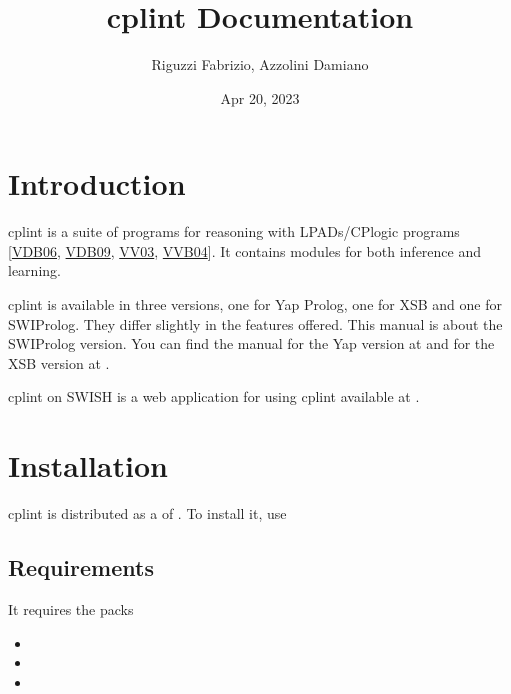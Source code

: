 \documentclass[letterpaper,10pt,english]{sphinxmanual}
\title{cplint Documentation}
\date{Apr 20, 2023}
\author{Riguzzi Fabrizio, Azzolini Damiano}
\begin{document}
\pagestyle{empty}
\sphinxmaketitle
\pagestyle{plain}
\sphinxtableofcontents
\pagestyle{normal}
\label{\detokenize{index::doc}}



\chapter{Introduction}
\label{\detokenize{index:introduction}}
\sphinxAtStartPar
cplint is a suite of programs for reasoning with LPADs/CP\sphinxhyphen{}logic programs {[}\hyperlink{cite.index:id66}{VDB06}, \hyperlink{cite.index:id67}{VDB09}, \hyperlink{cite.index:id65}{VV03}, \hyperlink{cite.index:id45}{VVB04}{]}.
It contains modules for both inference and learning.

\sphinxAtStartPar
cplint is available in three versions, one for Yap Prolog, one for XSB and one for SWI\sphinxhyphen{}Prolog.
They differ slightly in the features offered.
This manual is about the SWI\sphinxhyphen{}Prolog version.
You can find the manual for the Yap version at  and
for the XSB version at .

\sphinxAtStartPar
cplint on SWISH is a web application for using cplint available at .


\chapter{Installation}
\label{\detokenize{index:installation}}
\sphinxAtStartPar
cplint is distributed as a  of .
To install it, use

\begin{sphinxVerbatim}[commandchars=\\\{\}]
 
\end{sphinxVerbatim}


\section{Requirements}
\label{\detokenize{index:requirements}}
\sphinxAtStartPar
It requires the packs
\begin{itemize}
\item {} 
\sphinxAtStartPar
{}

\item {} 
\sphinxAtStartPar
{}

\item {} 
\sphinxAtStartPar
{}

\end{itemize}
\end{document}
